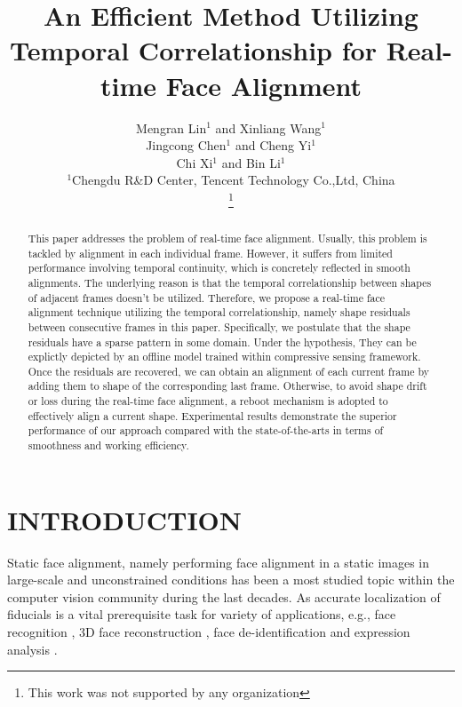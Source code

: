 \documentclass[a4paper, 10pt, conference]{ieeeconf}      %
\title{\LARGE \bf
An Efficient Method Utilizing Temporal Correlationship for Real-time Face Alignment
}
\begin{document}
\ifFGfinal
\thispagestyle{empty}
\pagestyle{empty}
\else
\author{\parbox{16cm}
	{\centering
		{
		\large Mengran Lin$^1$ and Xinliang Wang$^1$\\
				 Jingcong Chen$^1$ and Cheng Yi$^1$\\
				 Chi Xi$^1$ and Bin Li$^1$
		}\\
		{\normalsize
             $^1$Chengdu R\&D Center, Tencent Technology Co.,Ltd, China
		}
	}
	\thanks{This work was not supported by any organization}%
}
\pagestyle{plain}
\fi
\maketitle
\begin{abstract}
This paper addresses the problem of real-time face alignment.
Usually, this problem is tackled by alignment in each individual frame.
However, it suffers from limited performance involving temporal continuity, which is concretely reflected in smooth alignments.
The underlying reason is that the temporal correlationship between shapes of adjacent frames doesn't be utilized.
Therefore, we propose a real-time face alignment technique utilizing the temporal correlationship, namely shape residuals between
consecutive frames in this paper.
Specifically, we postulate that the shape residuals have a sparse pattern in some domain.
Under the hypothesis, They can be explictly depicted by an offline model trained within compressive sensing framework.
Once the residuals are recovered, we can obtain an alignment of each current frame by adding them to shape of the corresponding last frame.
Otherwise, to avoid shape drift or loss during the real-time face alignment, a reboot mechanism is adopted to effectively align
a current shape.
Experimental results demonstrate the superior performance of our approach compared with the state-of-the-arts in terms of smoothness
and working efficiency.
\end{abstract}
\section{INTRODUCTION}
Static face alignment, namely performing face alignment in a static images in large-scale and unconstrained conditions has been a most
studied topic within the computer vision community during the last decades. As accurate localization of fiducials is a vital
prerequisite task for variety of applications, e.g., face recognition \cite{wagner2012toward}, 3D face reconstruction
\cite{roth2015unconstrained,roth2016adaptive}, face de-identification \cite{jourabloo2015attribute} and expression analysis
\cite{guo2016dynamic,hu2014robust,vogler2007best}. 
\end{document}
